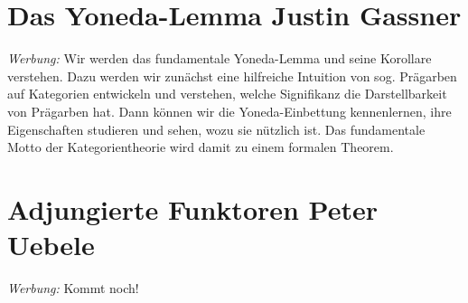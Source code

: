 \documentclass[a4paper,ngerman]{scrartcl}
\theoremstyle{definition}
\theoremstyle{plain}
\theoremstyle{remark}
\begin{document}
\section[Das Yoneda-Lemma]{Das Yoneda-Lemma \hfill \small Justin Gassner}

\emph{Werbung:} Wir werden das fundamentale Yoneda-Lemma und seine Korollare
verstehen. Dazu werden wir zunächst eine hilfreiche Intuition von sog. Prägarben auf
Kategorien entwickeln und verstehen, welche Signifikanz die Darstellbarkeit von
Prägarben hat. Dann können wir die Yoneda-Einbettung kennenlernen, ihre
Eigenschaften studieren und sehen, wozu sie nützlich ist. Das fundamentale
Motto der Kategorientheorie wird damit zu einem formalen Theorem.


\section[Adjungierte Funktoren]{Adjungierte Funktoren \hfill \small Peter
Uebele}

\emph{Werbung:} Kommt noch!
\end{document}
